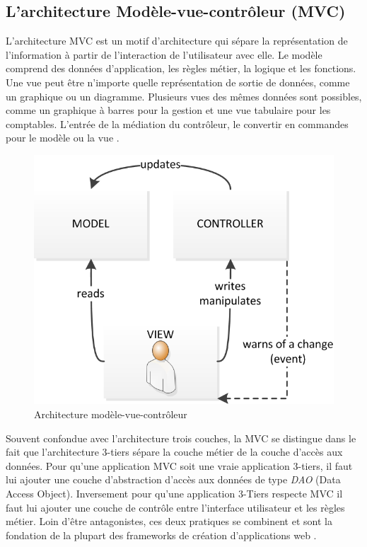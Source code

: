 \subsection{L'architecture Modèle-vue-contrôleur (MVC)}

L'architecture MVC est un motif d'architecture qui sépare la représentation de l'information à partir de l'interaction de l'utilisateur avec elle. Le modèle comprend des données d'application, les règles métier, la logique et les fonctions. Une vue peut être n'importe quelle représentation de sortie de données, comme un graphique ou un diagramme. Plusieurs vues des mêmes données sont possibles, comme un graphique à barres pour la gestion et une vue tabulaire pour les comptables. L'entrée de la médiation du contrôleur, le convertir en commandes pour le modèle ou la vue \cite{mvc}. 

\begin{figure}[h]
\begin{center}
    \includegraphics[scale=1.0]{img/mvc}
    \caption{Architecture modèle-vue-contrôleur}
	\label{3-tier}
\end{center}
\end{figure}

Souvent confondue avec l'architecture trois couches, la MVC se distingue dans le fait que l'architecture 3-tiers sépare la couche métier de la couche d'accès aux données. Pour qu'une application MVC soit une vraie application 3-tiers, il faut lui ajouter une couche d'abstraction d'accès aux données de type \textit{DAO} (Data Access Object). Inversement pour qu'une application 3-Tiers respecte MVC il faut lui ajouter une couche de contrôle entre l'interface utilisateur et les règles métier. Loin d'être antagonistes, ces deux pratiques se combinent et sont la fondation de la plupart des frameworks de création d'applications web \cite{mvc-3-tier}.


